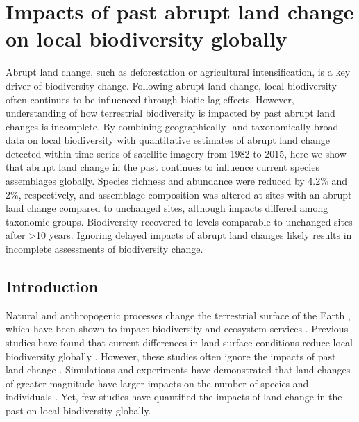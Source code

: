 \chapter{Impacts of past abrupt land change on local biodiversity globally}
\label{C03}
Abrupt land change, such as deforestation or agricultural intensification, is a key driver of biodiversity change. Following abrupt land change, local biodiversity often continues to be influenced through biotic lag effects. However, understanding of how terrestrial biodiversity is impacted by past abrupt land changes is incomplete. By combining geographically- and taxonomically-broad data on local biodiversity with quantitative estimates of abrupt land change detected within time series of satellite imagery from 1982 to 2015, here we show that abrupt land change in the past continues to influence current species assemblages globally. Species richness and abundance were reduced by 4.2\% and 2\%, respectively, and assemblage composition was altered at sites with an abrupt land change compared to unchanged sites, although impacts differed among taxonomic groups. Biodiversity recovered to levels comparable to unchanged sites after >10 years. Ignoring delayed impacts of abrupt land changes likely results in incomplete assessments of biodiversity change.

\section{Introduction}
\label{C03_01}
Natural and anthropogenic processes change the terrestrial surface of the Earth \citep{Ellis2013,Song2018}, which have been shown to impact biodiversity \citep{Newbold2015,Jung2018} and ecosystem services \citep{Isbell2015}. Previous studies have found that current differences in land-surface conditions reduce local biodiversity globally \citep{Gibson2011,Newbold2015}. However, these studies often ignore the impacts of past land change \citep{Foster2003,Watson2014}. Simulations and experiments have demonstrated that land changes of greater magnitude have larger impacts on the number of species and individuals \citep{Dornelas2010,Hautier2015,Santini2016}. Yet, few studies have quantified the impacts of land change in the past on local biodiversity globally.

